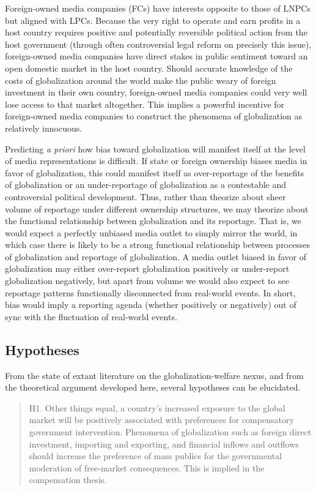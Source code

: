 \documentclass[12pt]{report}
\begin{document}
Foreign-owned media companies (FCs) have interests opposite to those of LNPCs but aligned with LPCs.
Because the very right to operate and earn profits in a host country requires positive and
potentially reversible political action from the host government (through often controversial legal
reform on precisely this issue), foreign-owned media companies have direct stakes in public
sentiment toward an open domestic market in the host country. Should accurate knowledge of the costs
of globalization around the world make the public weary of foreign investment in their own country,
foreign-owned media companies could very well lose access to that market altogether. This implies a
powerful incentive for foreign-owned media companies to construct the phenomena of globalization as
relatively innocuous.

Predicting \emph{a priori} how bias toward globalization will manifest itself at the level of media
representations is difficult. If state or foreign ownership biases media in favor of globalization,
this could manifest itself as over-reportage of the benefits of globalization or an under-reportage
of globalization as a contestable and controversial political development. Thus, rather than
theorize about sheer volume of reportage under different ownership structures, we may theorize about
the functional relationship between globalization and its reportage. That is, we would expect a
perfectly unbiased media outlet to simply mirror the world, in which case there is likely to be a
strong functional relationship between processes of globalization and reportage of globalization. A
media outlet biased in favor of globalization may either over-report globalization positively or
under-report globalization negatively, but apart from volume we would also expect to see reportage
patterns functionally disconnected from real-world events. In short, bias would imply a reporting
agenda (whether positively or negatively) out of sync with the fluctuation of real-world events.

\subsection{Hypotheses}

From the state of extant literature on the globalization-welfare nexus, and
from the theoretical argument developed here, several hypotheses can be elucidated.

\singlespacing \begin{quote} H1. Other things equal, a country's increased exposure to the global
market will be positively associated with preferences for compensatory government intervention.
Phenomena of globalization such as foreign direct investment, importing and exporting, and financial
inflows and outflows should increase the preference of mass publics for the governmental moderation
of free-market consequences. This is implied in the compensation thesis. \end{quote} \doublespacing
\end{document}
